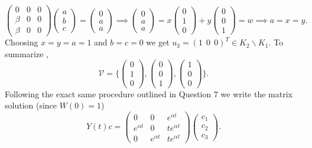 \documentclass[
	12pt,
	]{article}
\theoremstyle{definition}
\theoremstyle{definition}
\theoremstyle{definition}
\theoremstyle{definition}
\theoremstyle{definition}
\theoremstyle{example}
\theoremstyle{note}
\theoremstyle{remark}
\theoremstyle{example}
\begin{document}
				$$\begin{pmatrix}
						0 & 0 & 0 \\ \beta & 0 & 0 \\ \beta & 0 & 0
					\end{pmatrix}
					\begin{pmatrix}
						a \\ b \\ c
					\end{pmatrix} = 
					\begin{pmatrix}
					0 \\ a \\ a
					\end{pmatrix} \implies \begin{pmatrix}
					0 \\ a \\ a
					\end{pmatrix} = x \begin{pmatrix}
						0 \\ 1 \\ 0
					\end{pmatrix} + y \begin{pmatrix}
						0 \\ 0 \\ 1
					\end{pmatrix} = w \implies a= x =y.$$
				Choosing $x=y=a =1 $ and $b=c =0$ we get $u_{3} = (1 \ \ 0 \ \ 0)^{T} \in K_{2} \backslash K_{1}.$ To summarize ,
				$$ \mathcal{V} = \Biggl\{\begin{pmatrix}
					0 \\ 1 \\0 
				\end{pmatrix} , 
				\begin{pmatrix}
					0 \\ 0 \\ 1
				\end{pmatrix}, 
				\begin{pmatrix}
					1 \\ 0 \\0 
				\end{pmatrix}\Biggr\}.$$
				Following the exact same procedure outlined in Question 7 we write the matrix solution (since $W(0)=1$)
				$$ Y(t)c = \begin{pmatrix}
					0 & 0 & e^{\alpha t} \\ e^{\alpha t } & 0 & te^{\alpha t} \\
					0 & e^{\alpha t} & t e^{\alpha t} 
				\end{pmatrix}\begin{pmatrix}
					c_{1} \\ c_{2} \\ c_{3}
				\end{pmatrix}.$$
\end{document}
